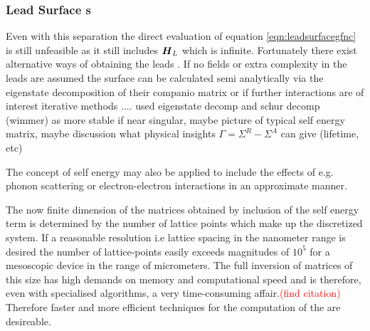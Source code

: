 \subsubsection{Lead Surface \gfnc s}
Even with this separation the direct evaluation of equation \ref{eqn:leadsurfacegfnc} is still unfeasible as it still includes $\boldsymbol{H}_L$ which is infinite. Fortunately there exist alternative ways of obtaining the leads \gfnc{}.
If no fields or extra complexity in the leads are assumed the surface \gfnc{} can  be calculated semi analytically via the eigenstate decomposition of their companio matrix \cite{PhysRevB.55.5266} \cite{PhysRevB.66.205319} or if further interactions are of interest iterative methods ....
used eigenstate decomp and schur decomp (wimmer) as more stable if near singular, maybe picture of typical self energy matrix, maybe discussion what physical insights $\Gamma = \Sigma^R - \Sigma^A$ can give (lifetime, etc)

The concept of self energy may also be applied to include the effects of e.g. phonon scattering or electron-electron interactions in an approximate manner.

The now finite dimension of the matrices obtained by inclusion of the self energy term is determined by the number of lattice points which make up the discretized system.
If a reasonable resolution i.e lattice spacing in the nanometer range is desired the number of lattice-points easily exceeds magnitudes of $10^5$ for a mesoscopic device in the range of micrometers. 
The full inversion of matrices of this size has high demands on memory and computational speed and is therefore, even with specialised algorithms, a very time-consuming affair.\textcolor{red}{(find citation)}
Therefore faster and more efficient techniques for the computation of the \gfnc{} are desireable.
